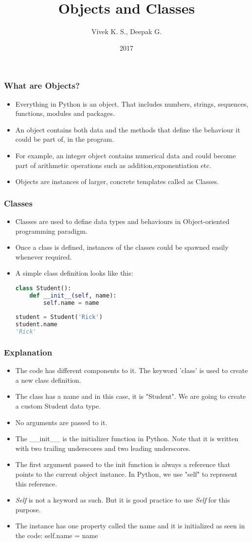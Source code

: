 \documentclass{beamer}
\title{Objects and Classes}
\author{Vivek K. S., Deepak G.}
\institute{Information Systems Decision Sciences (ISDS)\\
MUMA College of Business\\
University of South Florida \\
Tampa, Florida}
\date{2017}
\begin{document}
\frame{\titlepage}

\begin{frame}
\frametitle{What are Objects?}
\begin{itemize}
\item Everything in Python is an object. That includes numbers, strings, sequences, functions, modules and packages.
\item An object contains both data and the methods that define the behaviour it could be part of, in the program.
\item For example, an integer object contains numerical data and could become part of arithmetic operations such as addition,exponentiation etc.
\item Objects are instances of larger, concrete templates called as Classes. 
\end{itemize}
\end{frame}

\begin{frame}[fragile]
\frametitle{Classes}
\begin{itemize}
\item Classes are used to define data types and behaviours in Object-oriented programming paradigm.
\item Once a class is defined, instances of the classes could be spawned easily whenever required.
\item A simple class definition looks like this:

\begin{lstlisting}[language=Python]
class Student():
	def __init__(self, name):
		self.name = name
		
student = Student('Rick')
student.name
'Rick'
\end{lstlisting}
\end{itemize}
\end{frame}

\begin{frame}
\frametitle{Explanation}
\begin{itemize}
\item The code has different components to it. The keyword 'class' is used to create a new class definition.
\item The class has a name and in this case, it is "Student". We are going to create a custom Student data type.
\item No arguments are passed to it.
\item The \_\_init\_\_ is the initializer function in Python. Note that it is written with two trailing underscores and two leading underscores.
\item The first argument passed to the init function is always a reference that points to the current object instance. In Python, we use "self" to represent this reference.
\item \textit{Self} is not a keyword as such. But it is good practice to use \textit{Self} for this purpose.
\item The instance has one property called the name and it is initialized as seen in the code:
self.name = name
\end{itemize}
\end{frame}
\end{document}
